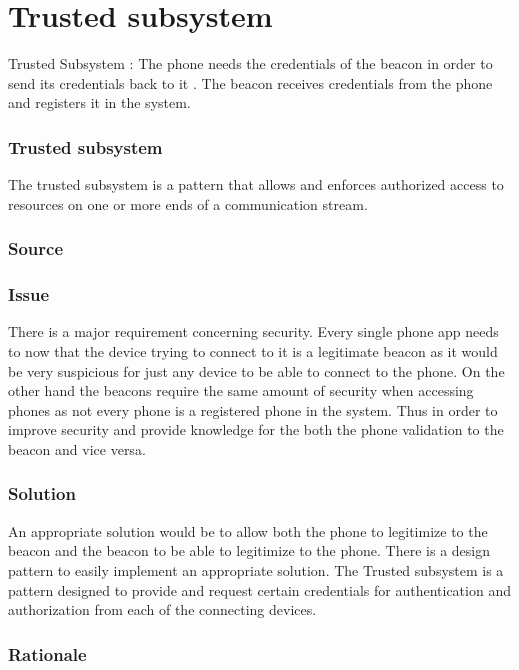 

\section{Trusted subsystem}

Trusted Subsystem : The phone needs the credentials of the beacon in order to send its credentials back to it . The beacon receives credentials from the phone and registers it in the system. 
	
	\subsubsection{Trusted subsystem}
	The trusted subsystem is a pattern that allows and enforces authorized access to resources on one or more ends of a communication stream.

	\subsubsection{Source} \cite{book:design-patterns}

	\subsubsection{Issue} \label{trustedP:issue}

		There is a major requirement concerning security. Every single phone app needs to now that the device trying to connect to it is a legitimate beacon as it would be very suspicious for just any device to be able to connect to the phone. On the other hand the beacons require the same amount of security when accessing phones as not every phone is a registered phone in the system. Thus in order to improve security and provide knowledge for the both the phone validation to the beacon and vice versa.


	\subsubsection{Solution} 

		An appropriate solution would be to allow both the phone to legitimize to the beacon and the beacon to be able to legitimize to the phone. There is a design pattern to easily implement an appropriate solution. The Trusted subsystem is a pattern designed to provide and request certain credentials for authentication and authorization from each of the connecting devices.

	\subsubsection{Rationale} \label{trustedP:rationale}

